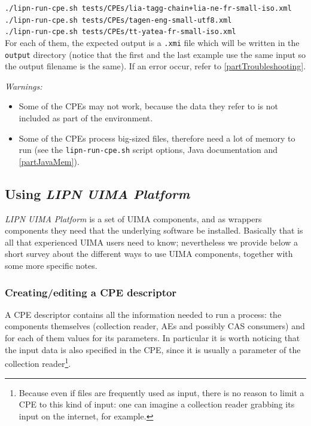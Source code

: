 \documentclass{article}
\newcommand{\softName}{{\em LIPN UIMA Platform}\xspace}
\begin{document}
{\tt ./lipn-run-cpe.sh tests/CPEs/lia-tagg-chain+lia-ne-fr-small-iso.xml }\\
{\tt ./lipn-run-cpe.sh tests/CPEs/tagen-eng-small-utf8.xml }\\
{\tt ./lipn-run-cpe.sh tests/CPEs/tt-yatea-fr-small-iso.xml }\\

For each of them, the expected output is a {\tt .xmi} file which will be written in the {\tt output} directory (notice that the first and the last example use the same input so the output filename is the same). If an error occur, refer to \ref{partTroubleshooting}.

{\em Warnings:}
\begin{itemize}
\item Some of the CPEs may not work, because the data they refer to is not included as part of the environment.
\item Some of the CPEs process big-sized files, therefore need a lot of memory to run (see the {\tt lipn-run-cpe.sh} script options, Java documentation and \ref{partJavaMem}).  
\end{itemize} 


\subsection{Using \softName}
\label{partUsing}


 \softName is a set of UIMA components, and as wrappers components they need that the underlying software be installed. Basically that is all that experienced UIMA users need to know; nevertheless we provide below a short survey about the different ways to use UIMA components, together with some more specific notes.


\subsubsection{Creating/editing a CPE descriptor}

\label{partCPE}
A CPE descriptor contains all the information needed to run a process: the components themselves (collection reader, AEs and possibly CAS consumers) and for each of them values for its parameters. In particular it is worth noticing that the input data is also specified in the CPE, since it is usually a parameter of the collection reader\footnote{Because even if files are frequently used as input, there is no reason to limit a CPE to this kind of input: one can imagine a collection reader grabbing its input on the internet, for example.}.
\end{document}
